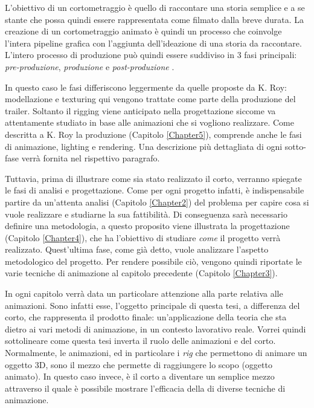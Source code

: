 L'obiettivo di un cortometraggio è quello di raccontare una storia semplice e a se stante che possa quindi essere rappresentata come filmato dalla breve durata.
La creazione di un cortometraggio animato è quindi un processo che coinvolge l'intera pipeline grafica con l'aggiunta dell'ideazione di una storia da raccontare. L'intero processo di produzione può quindi essere suddiviso in 3 fasi principali: \emph{pre-produzione}, \emph{produzione} e \emph{post-produzione} \parencite{roy2014finish}.
\newline

In questo caso le fasi differiscono leggermente da quelle proposte da K. Roy: modellazione e texturing qui vengono trattate come parte della produzione del trailer. Soltanto il rigging viene anticipato nella progettazione siccome va attentamente studiato in base alle animazioni che si vogliono realizzare. Come descritta a K. Roy la produzione (Capitolo \ref{Chapter5}), comprende anche le fasi di animazione, lighting e rendering. Una descrizione più dettagliata di ogni sotto-fase verrà fornita nel rispettivo paragrafo.

Tuttavia, prima di illustrare come sia stato realizzato il corto, verranno spiegate le fasi di analisi e
progettazione. Come per ogni progetto infatti, è indispensabile partire da un'attenta analisi (Capitolo \ref{Chapter2}) del problema per capire cosa si vuole realizzare e studiarne la sua fattibilità. Di conseguenza sarà necessario definire una metodologia, a questo proposito viene illustrata la progettazione (Capitolo \ref{Chapter4}), che ha l'obiettivo di studiare \emph{come} il progetto verrà realizzato.
Quest'ultima fase, come già detto, vuole analizzare l'aspetto metodologico del progetto. Per rendere possibile ciò, vengono quindi riportate le varie tecniche di animazione al capitolo precedente (Capitolo \ref{Chapter3}).

In ogni capitolo verrà data un particolare attenzione alla parte relativa alle animazioni. Sono infatti esse, l'oggetto principale di questa tesi, a differenza del corto, che rappresenta il prodotto finale: un'applicazione della teoria che sta dietro ai vari metodi di animazione, in un contesto lavorativo reale. Vorrei quindi sottolineare come questa tesi inverta il ruolo delle animazioni e del corto. Normalmente, le animazioni, ed in particolare i \emph{rig} che permettono di animare un oggetto 3D, sono il mezzo che permette di raggiungere lo scopo (oggetto animato). In questo caso invece, è il corto a diventare un semplice mezzo attraverso il quale è possibile mostrare l'efficacia della di diverse tecniche di animazione.


